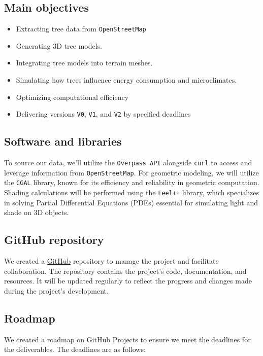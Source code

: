 \documentclass[12pt]{article}
\begin{document}
\subsection{Main objectives}

\begin{itemize}
    \item Extracting tree data from \texttt{OpenStreetMap}
    \item Generating 3D tree models.
    \item Integrating tree models into terrain meshes.
    \item Simulating how trees influence energy consumption and microclimates.
    \item Optimizing computational efficiency
    \item Delivering versions \texttt{V0}, \texttt{V1}, and \texttt{V2} by specified deadlines
\end{itemize}

\newpage

\subsection{Software and libraries}
To source our data, we'll utilize the \texttt{Overpass API} \cite{overpass} alongside
\texttt{curl} \cite{curl} to access and leverage information from \texttt{OpenStreetMap}.
For geometric modeling, we will utilize the \texttt{CGAL} library, known for its efficiency and
reliability in geometric computation\cite{cgal}. Shading calculations will be performed using the
\texttt{Feel++} \cite{feel++} library, which specializes in solving Partial Differential Equations (PDEs)
essential for simulating light and shade on 3D objects.

\subsection{GitHub repository}
We created a \href{https://github.com/master-csmi/2024-m1-vegetation}{GitHub} repository to manage the project and facilitate collaboration.
The repository contains the project's code, documentation, and resources. It will be
updated regularly to reflect the progress and changes made during the project's
development.

\subsection{Roadmap}
We created a roadmap on GitHub Projects to ensure we meet the deadlines for the
deliverables.
The deadlines are as follows:
\end{document}
